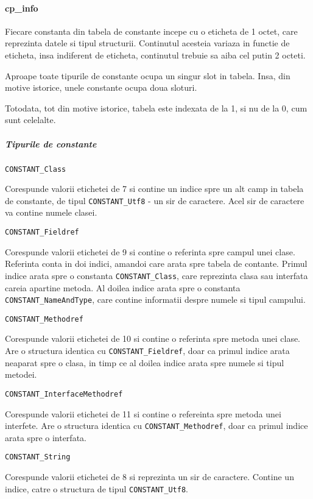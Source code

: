 \documentclass[]{article}
\let\oldparagraph\paragraph
\renewcommand{\paragraph}[1]{\oldparagraph{#1}\mbox{}}
\let\oldsubparagraph\subparagraph
\renewcommand{\subparagraph}[1]{\oldsubparagraph{#1}\mbox{}}
\begin{document}
\paragraph{cp\_info}\label{cp_info}

Fiecare constanta din tabela de constante incepe cu o eticheta de 1
octet, care reprezinta datele si tipul structurii. Continutul acesteia
variaza in functie de eticheta, insa indiferent de eticheta, continutul
trebuie sa aiba cel putin 2 octeti.

Aproape toate tipurile de constante ocupa un singur slot in tabela.
Insa, din motive istorice, unele constante ocupa doua sloturi.

Totodata, tot din motive istorice, tabela este indexata de la 1, si nu
de la 0, cum sunt celelalte.

\subparagraph{Tipurile de constante}\label{tipurile-de-constante}

\texttt{CONSTANT\_Class}

Corespunde valorii etichetei de 7 si contine un indice spre un alt camp
in tabela de constante, de tipul \texttt{CONSTANT\_Utf8} - un sir de
caractere. Acel sir de caractere va contine numele clasei.

\texttt{CONSTANT\_Fieldref}

Corespunde valorii etichetei de 9 si contine o referinta spre campul
unei clase. Referinta conta in doi indici, amandoi care arata spre
tabela de contante. Primul indice arata spre o constanta
\texttt{CONSTANT\_Class}, care reprezinta clasa sau interfata careia
apartine metoda. Al doilea indice arata spre o constanta
\texttt{CONSTANT\_NameAndType}, care contine informatii despre numele si
tipul campului.

\texttt{CONSTANT\_Methodref}

Corespunde valorii etichetei de 10 si contine o referinta spre metoda
unei clase. Are o structura identica cu \texttt{CONSTANT\_Fieldref},
doar ca primul indice arata neaparat spre o clasa, in timp ce al doilea
indice arata spre numele si tipul metodei.

\texttt{CONSTANT\_InterfaceMethodref}

Corespunde valorii etichetei de 11 si contine o refereinta spre metoda
unei interfete. Are o structura identica cu
\texttt{CONSTANT\_Methodref}, doar ca primul indice arata spre o
interfata.

\texttt{CONSTANT\_String}

Corespunde valorii etichetei de 8 si reprezinta un sir de caractere.
Contine un indice, catre o structura de tipul \texttt{CONSTANT\_Utf8}.
\end{document}
